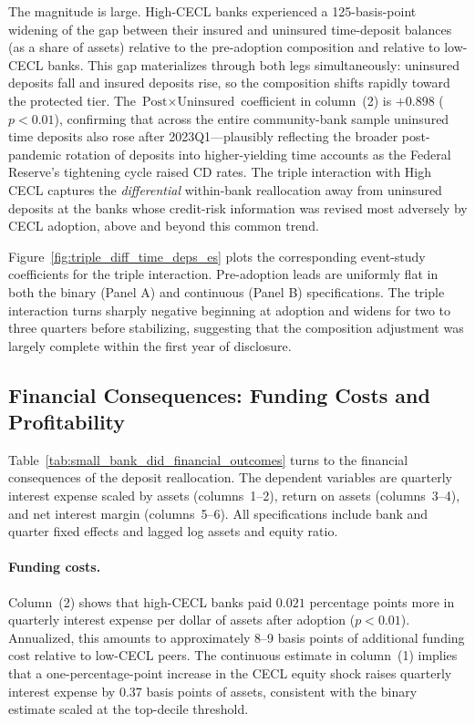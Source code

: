 The magnitude is large. High-CECL banks experienced a 125-basis-point widening
of the gap between their insured and uninsured time-deposit balances (as a share
of assets) relative to the pre-adoption composition and relative to low-CECL
banks. This gap materializes through both legs simultaneously: uninsured deposits
fall and insured deposits rise, so the composition shifts rapidly toward the
protected tier. The $\text{Post} \times \text{Uninsured}$ coefficient in
column~(2) is $+0.898$ ($p < 0.01$), confirming that across the entire
community-bank sample uninsured time deposits also rose after 2023Q1—plausibly
reflecting the broader post-pandemic rotation of deposits into higher-yielding
time accounts as the Federal Reserve's tightening cycle raised CD rates. The
triple interaction with High CECL captures the \textit{differential} within-bank
reallocation away from uninsured deposits at the banks whose credit-risk
information was revised most adversely by CECL adoption, above and beyond this
common trend.

Figure~\ref{fig:triple_diff_time_deps_es} plots the corresponding event-study
coefficients for the triple interaction. Pre-adoption leads are uniformly flat in
both the binary (Panel A) and continuous (Panel B) specifications. The triple
interaction turns sharply negative beginning at adoption and widens for two to
three quarters before stabilizing, suggesting that the composition adjustment was
largely complete within the first year of disclosure.

\subsection{Financial Consequences: Funding Costs and Profitability}
\label{sec:results:financial}

Table~\ref{tab:small_bank_did_financial_outcomes} turns to the financial
consequences of the deposit reallocation. The dependent variables are quarterly
interest expense scaled by assets (columns~1--2), return on assets (columns~3--4),
and net interest margin (columns~5--6). All specifications include bank and
quarter fixed effects and lagged log assets and equity ratio.

\paragraph{Funding costs.}
Column~(2) shows that high-CECL banks paid $0.021$ percentage points more in
quarterly interest expense per dollar of assets after adoption ($p < 0.01$).
Annualized, this amounts to approximately 8--9 basis points of additional funding
cost relative to low-CECL peers. The continuous estimate in column~(1)
implies that a one-percentage-point increase in the CECL equity shock raises
quarterly interest expense by 0.37 basis points of assets, consistent with the
binary estimate scaled at the top-decile threshold.

